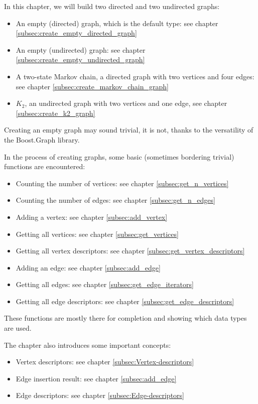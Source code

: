 In this chapter, we will build two directed and two undirected graphs:

\begin{itemize}
  \item An empty (directed) graph, which is the default type: 
    see chapter \ref{subsec:create_empty_directed_graph}
  \item An empty (undirected) graph: 
    see chapter \ref{subsec:create_empty_undirected_graph}
  \item A two-state Markov chain, a directed graph with two vertices 
    and four edges:
    see chapter \ref{subsec:create_markov_chain_graph}
  \item $K_{2}$, an undirected graph with two vertices and one edge, 
    see chapter \ref{subsec:create_k2_graph}
\end{itemize}

Creating an empty graph may sound trivial, it is not, thanks to the versatility
of the Boost.Graph library.

In the process of creating graphs, some basic (sometimes bordering trivial)
functions are encountered:

\begin{itemize}
  \item Counting the number of vertices:
    see chapter \ref{subsec:get_n_vertices}
  \item Counting the number of edges:
     see chapter \ref{subsec:get_n_edges}
  \item Adding a vertex:
     see chapter \ref{subsec:add_vertex}
  \item Getting all vertices:
     see chapter \ref{subsec:get_vertices}
  \item Getting all vertex descriptors:
     see chapter \ref{subsec:get_vertex_descriptors}
  \item Adding an edge:
     see chapter \ref{subsec:add_edge}
  \item Getting all edges:
    see chapter \ref{subsec:get_edge_iterators}
  \item Getting all edge descriptors:
    see chapter \ref{subsec:get_edge_descriptors}
\end{itemize}

These functions are mostly there for completion and showing which data types
are used.

The chapter also introduces some important concepts:

\begin{itemize}
  \item Vertex descriptors:
    see chapter \ref{subsec:Vertex-descriptors}
  \item Edge insertion result:
    see chapter \ref{subsec:add_edge}
  \item Edge descriptors:
    see chapter \ref{subsec:Edge-descriptors}
\end{itemize}

